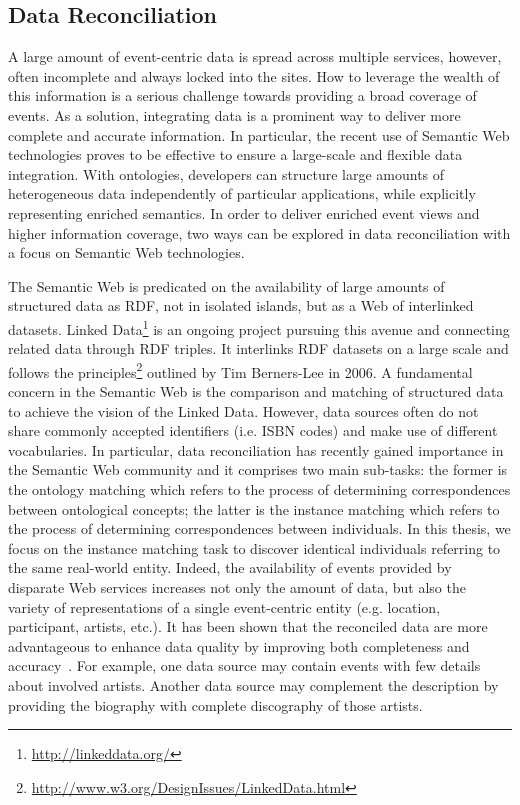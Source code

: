\subsection{Data Reconciliation}

A large amount of event-centric data is spread across multiple services, however, often incomplete and always locked into the sites.
How to leverage the wealth of this information is a serious challenge towards providing a broad coverage of events. As a solution, integrating data is a prominent way to deliver more complete and accurate information. In particular, the recent use of Semantic Web technologies proves to be effective to ensure a large-scale and flexible data integration. With ontologies, developers can structure large amounts of heterogeneous data independently of particular applications, while explicitly representing enriched semantics. In order to deliver enriched event views and higher information coverage, two ways can be explored in data reconciliation with a focus on Semantic Web technologies. 

The Semantic Web is predicated on the availability of large amounts of structured data as RDF, not in isolated islands, but as a Web of interlinked datasets. Linked Data\footnote{\url{http://linkeddata.org/}} is an ongoing project pursuing this avenue and connecting related data through RDF triples\cite{Bizer:HB09}. It interlinks RDF datasets on a large scale and follows the principles\footnote{\url{http://www.w3.org/DesignIssues/LinkedData.html}} outlined by Tim Berners-Lee in 2006. A fundamental concern in the Semantic Web is the comparison and matching of structured data to achieve the vision of the Linked Data. However, data sources often do not share commonly accepted identifiers (i.e. ISBN codes) and make use of different vocabularies. In particular, data reconciliation has recently gained importance in the Semantic Web community and it comprises two main sub-tasks: the former is the ontology matching which refers to the process of determining correspondences between ontological concepts; the latter is the instance matching which refers to the process of determining correspondences between individuals. In this thesis, we focus on the instance matching task to discover identical individuals referring to the same real-world entity. Indeed, the availability of events provided by disparate Web services increases not only the amount of data, but also the variety of representations of a single event-centric entity (e.g. location, participant, artists, etc.). It has been shown that the reconciled data are more advantageous to enhance data quality by improving both completeness and accuracy~\cite{Naumann:2010}. For example, one data source may contain events with few details about involved artists. Another data source may complement the description by providing the biography with complete discography of those artists.

